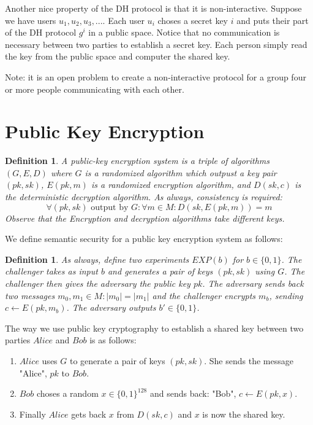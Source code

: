 \documentclass[twoside]{article}
\newtheorem{definition}[theorem]{Definition}
\begin{document}
Another nice property of the DH protocol is that it is non-interactive. Suppose  we have users $u_1, u_2, u_3, ...$. Each user $u_i$ choses a secret key $i$ and puts their part of the DH protocol $g^i$ in a public space. Notice that no communication is necessary between two parties to establish a secret key. Each person simply read the key from the public space and computer the shared key. 

Note: it is an open problem to create a non-interactive protocol for a group four or more people communicating with each other.

\section{Public Key Encryption} 

\begin{definition}
A public-key encryption system is a triple of algorithms $(G, E, D)$ where $G$ is a randomized algorithm which outpust a key pair $(pk, sk)$, $E(pk, m)$ is a randomized encryption algorithm, and $D(sk, c)$ is the deterministic decryption algorithm. As always, consistency is required: 
\[\forall (pk, sk) \mbox{ output by } G: \forall m \in M: D(sk, E(pk, m)) = m\]
Observe that the Encryption and decryption algorithms take different keys. 
\end{definition}

We define semantic security for a public key encryption system as follows:
\begin{definition}
As always, define two experiments $EXP(b)$ for $b \in \{0,1\}$. The challenger takes as input $b$ and generates a pair of keys $(pk, sk)$ using $G$. The challenger then gives the adversary the public key $pk$. The adversary sends back two messages $m_0, m_1 \in M: |m_0| = |m_1|$ and the challenger encrypts $m_b$, sending $c \leftarrow E(pk, m_b)$. The adversary outputs $b' \in \{0, 1\}$. 
\end{definition}

The way we use public key cryptography to establish a shared key between two parties $Alice$ and $Bob$ is as follows:
\begin{enumerate}
\item $Alice$ uses $G$ to generate a pair of keys $(pk, sk)$. She sends the message "Alice", $pk$ to $Bob$.
\item $Bob$ choses a random $x \in \{0,1\}^{128}$ and sends back: "Bob", $c \leftarrow E(pk, x)$. 
\item Finally $Alice$ gets back $x$ from $D(sk, c)$ and $x$ is now the shared key.
\end{enumerate}
\end{document}
